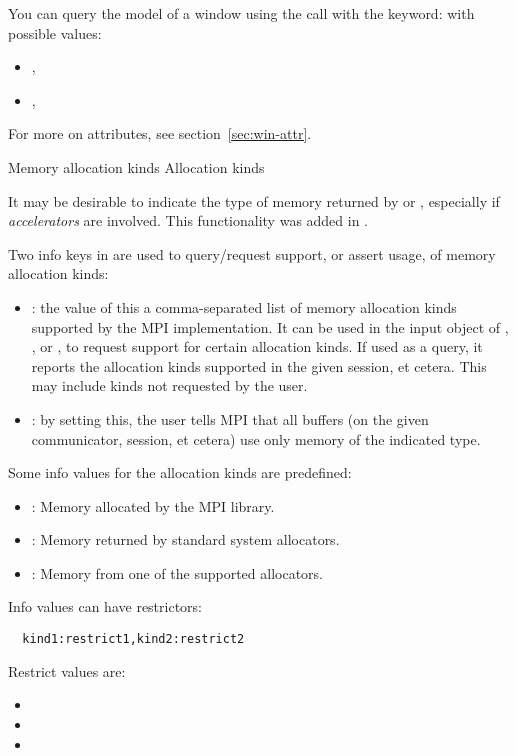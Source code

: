 You can query the model of a window
using the  call
with the  keyword:
%
%
with possible values:
\begin{itemize}
\item {},
\item {},
\end{itemize}
For more on attributes, see section~\ref{sec:win-attr}.

\begin{mpifournote}{Memory allocation kinds}
 {Allocation kinds}
\label{sec:mpi-alloc-kind}

It may be desirable to indicate the type of memory returned
by  or ,
especially if
\emph{accelerators}
are involved.
This functionality was added in .

Two info keys in  are used to query/request support,
or assert usage,
of memory allocation kinds:
\begin{itemize}
\item {}:
  the value of this a comma-separated list of memory allocation kinds
  supported by the MPI implementation.
  It can be used in the input  object of
  , ,
  or ,
  to request support for certain allocation kinds.
  If used as a query, it reports the allocation kinds supported
  in the given session, et cetera. This may include kinds not requested by the user.
\item {}:
  by setting this, the user tells MPI that all buffers
  (on the given communicator, session, et cetera)
  use only memory of the indicated type.
\end{itemize}

Some info values for the allocation kinds are predefined: 
\begin{itemize}
\item {}: Memory allocated by the MPI library.
\item {}: Memory returned by standard system allocators.
\item {}: Memory from one of the supported allocators.
\end{itemize}
Info values can have restrictors:
\begin{verbatim}
  kind1:restrict1,kind2:restrict2
\end{verbatim}
Restrict values are:
\begin{itemize}
\item {}
\item {}
\item {}
\end{itemize}

\end{mpifournote}

